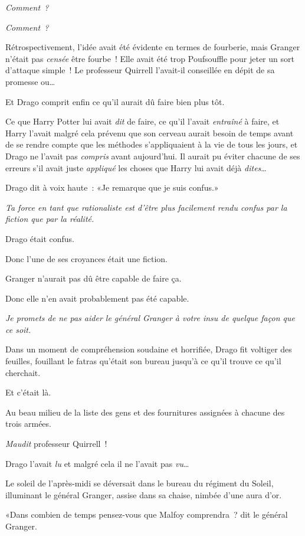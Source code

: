 \emph{Comment~?}

\emph{Comment~?}

Rétrospectivement, l'idée avait été évidente en termes de fourberie, mais Granger n'était pas \emph{censée} être fourbe~! Elle avait été trop Poufsouffle pour jeter un sort d'attaque simple~! Le professeur Quirrell l'avait-il conseillée en dépit de sa promesse ou…

Et Drago comprit enfin ce qu'il aurait dû faire bien plus tôt.

Ce que Harry Potter lui avait \emph{dit} de faire, ce qu'il l'avait \emph{entraîné} à faire, et Harry l'avait malgré cela prévenu que son cerveau aurait besoin de temps avant de se rendre compte que les méthodes s'appliquaient à la vie de tous les jours, et Drago ne l'avait pas \emph{compris} avant aujourd'hui. Il aurait pu éviter chacune de ses erreurs s'il avait juste \emph{appliqué} les choses que Harry lui avait déjà \emph{dites}…

Drago dit à voix haute~: «Je remarque que je suis confus.»

\emph{Ta force en tant que rationaliste est d'être plus facilement rendu confus par la fiction que par la réalité.}

Drago était confus.

Donc l'une de ses croyances était une fiction.

Granger n'aurait pas dû être capable de faire ça.

Donc elle n'en avait probablement pas été capable.

\emph{Je promets de ne pas aider le général Granger à votre insu de quelque façon que ce soit.}

Dans un moment de compréhension soudaine et horrifiée, Drago fit voltiger des feuilles, fouillant le fatras qu'était son bureau jusqu'à ce qu'il trouve ce qu'il cherchait.

Et c'était là.

Au beau milieu de la liste des gens et des fournitures assignées à chacune des trois armées.

\emph{Maudit} professeur Quirrell~!

Drago l'avait \emph{lu} et malgré cela il ne l'avait pas \emph{vu}…

\later

Le soleil de l'après-midi se déversait dans le bureau du régiment du Soleil, illuminant le général Granger, assise dans sa chaise, nimbée d'une aura d'or.

«Dans combien de temps pensez-vous que Malfoy comprendra~? dit le général Granger.

